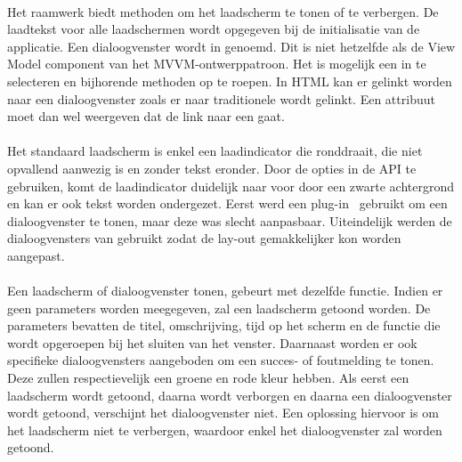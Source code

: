 \paragraph{\kendo}
Het raamwerk biedt methoden om het laadscherm te tonen of te verbergen.
De laadtekst voor alle laadschermen wordt opgegeven bij de initialisatie van de applicatie.
Een dialoogvenster wordt in \kendo{}  genoemd.
Dit is niet hetzelfde als de View Model component van het MVVM-ontwerppatroon.
Het is mogelijk een  in \js{} te selecteren en bijhorende methoden op te roepen.
In HTML kan er gelinkt worden naar een dialoogvenster zoals er naar traditionele  wordt gelinkt.
Een attribuut moet dan wel weergeven dat de link naar een  gaat.

\paragraph{\jqm}
Het standaard laadscherm is enkel een laadindicator die ronddraait, die niet opvallend aanwezig is en zonder tekst eronder.
Door de opties in de API te gebruiken, komt de laadindicator duidelijk naar voor door een zwarte achtergrond en kan er ook tekst worden ondergezet.
Eerst werd een plug-in~\cite{Sage2013} gebruikt om een dialoogvenster te tonen, maar deze was slecht aanpasbaar.
Uiteindelijk werden de dialoogvensters van \jqm{} gebruikt zodat de lay-out gemakkelijker kon worden aangepast.

\paragraph{\lungo}
Een laadscherm of dialoogvenster tonen, gebeurt met dezelfde functie.
Indien er geen parameters worden meegegeven, zal een laadscherm getoond worden.
De parameters bevatten de titel, omschrijving, tijd op het scherm en de functie die wordt opgeroepen bij het sluiten van het venster.
Daarnaast worden er ook specifieke dialoogvensters aangeboden om een succes- of foutmelding te tonen.
Deze zullen respectievelijk een groene en rode kleur hebben.
Als eerst een laadscherm wordt getoond, daarna wordt verborgen en daarna een dialoogvenster wordt getoond, verschijnt het dialoogvenster niet.
Een oplossing hiervoor is om het laadscherm niet te verbergen, waardoor enkel het dialoogvenster zal worden getoond.

